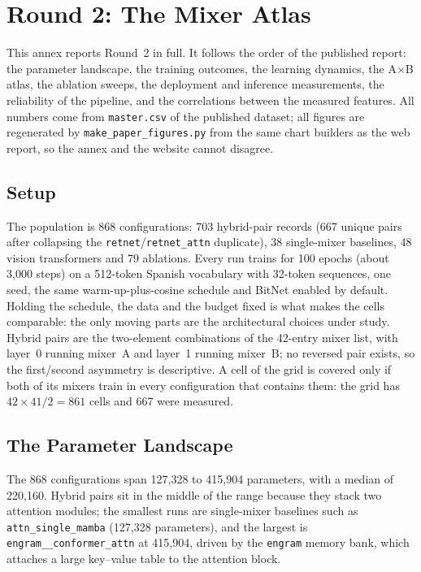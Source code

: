 \section{Round 2: The Mixer Atlas}
\label{sec:annex-experiment-2}

This annex reports Round~2 in full. It follows the order of the published report: the parameter landscape, the training outcomes, the learning dynamics, the A$\times$B atlas, the ablation sweeps, the deployment and inference measurements, the reliability of the pipeline, and the correlations between the measured features. All numbers come from \texttt{master.csv} of the published dataset; all figures are regenerated by \texttt{make\_paper\_figures.py} from the same chart builders as the web report, so the annex and the website cannot disagree.

\subsection{Setup}

The population is 868 configurations: 703 hybrid-pair records (667 unique pairs after collapsing the \texttt{retnet}/\texttt{retnet\_attn} duplicate), 38 single-mixer baselines, 48 vision transformers and 79 ablations. Every run trains for 100 epochs (about 3{,}000 steps) on a 512-token Spanish vocabulary with 32-token sequences, one seed, the same warm-up-plus-cosine schedule and BitNet enabled by default. Holding the schedule, the data and the budget fixed is what makes the cells comparable: the only moving parts are the architectural choices under study. Hybrid pairs are the two-element combinations of the 42-entry mixer list, with layer~0 running mixer~A and layer~1 running mixer~B; no reversed pair exists, so the first/second asymmetry is descriptive. A cell of the grid is covered only if both of its mixers train in every configuration that contains them: the grid has $42\times41/2 = 861$ cells and 667 were measured.

\subsection{The Parameter Landscape}

The 868 configurations span 127{,}328 to 415{,}904 parameters, with a median of 220{,}160. Hybrid pairs sit in the middle of the range because they stack two attention modules; the smallest runs are single-mixer baselines such as \texttt{attn\_single\_mamba} (127{,}328 parameters), and the largest is \texttt{engram\_\_conformer\_attn} at 415{,}904, driven by the \texttt{engram} memory bank, which attaches a large key--value table to the attention block.

